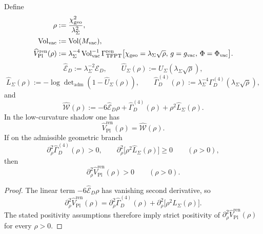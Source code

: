 \begin{lemma}
\label{lem:strict-convexity-rho-planck}
Define
\[
\begin{aligned}
\rho&:=\frac{\chi_{\mathrm{geo}}^2}{\lambda_\Sigma^2},
\\
\operatorname{Vol}_{\mathrm{vac}}&:=\operatorname{Vol}(M_{\mathrm{vac}}),
\\
\widehat V_{\mathrm{Pl}}^{\mathrm{ren}}(\rho)
&:=
\lambda_\Sigma^{-4}\operatorname{Vol}_{\mathrm{vac}}^{-1}
\Gamma_{\mathrm{TFPT}}^{\mathrm{ren}}
\bigl[\chi_{\mathrm{geo}}=\lambda_\Sigma\sqrt{\rho},\,g=g_{\mathrm{vac}},\,\Phi=\Phi_{\mathrm{vac}}\bigr].
\end{aligned}
\]
\[
\widehat{\mathcal E}_D:=\lambda_\Sigma^{-2}\mathcal E_D,
\qquad
\widehat U_\Sigma(\rho):=U_\Sigma(\lambda_\Sigma\sqrt{\rho}),
\]
\[
\widehat L_\Sigma(\rho):=-\log\det\nolimits_{\mathrm{adm}}(1-\widehat U_\Sigma(\rho)),
\qquad
\widehat\Gamma_D^{(4)}(\rho):=\lambda_\Sigma^{-4}\Gamma_D^{(4)}(\lambda_\Sigma\sqrt{\rho}),
\]
and
\[
\widehat{\mathcal W}(\rho):=
-6\widehat{\mathcal E}_D\rho
+\widehat\Gamma_D^{(4)}(\rho)
+\rho^2\widehat L_\Sigma(\rho).
\]
In the low-curvature shadow one has
\[
\widehat V_{\mathrm{Pl}}^{\mathrm{ren}}(\rho)=\widehat{\mathcal W}(\rho).
\]
If on the admissible geometric branch
\[
\partial_\rho^2\widehat\Gamma_D^{(4)}(\rho)>0,
\qquad
\partial_\rho^2\!\bigl[\rho^2\widehat L_\Sigma(\rho)\bigr]\ge 0
\qquad
(\rho>0),
\]
then
\[
\partial_\rho^2\widehat V_{\mathrm{Pl}}^{\mathrm{ren}}(\rho)>0
\qquad
(\rho>0).
\]
\end{lemma}

\begin{proof}
The linear term $-6\widehat{\mathcal E}_D\rho$ has vanishing second derivative, so
\[
\partial_\rho^2\widehat V_{\mathrm{Pl}}^{\mathrm{ren}}(\rho)
=
\partial_\rho^2\widehat\Gamma_D^{(4)}(\rho)
+
\partial_\rho^2\!\bigl[\rho^2\widehat L_\Sigma(\rho)\bigr].
\]
The stated positivity assumptions therefore imply strict positivity of
$\partial_\rho^2\widehat V_{\mathrm{Pl}}^{\mathrm{ren}}(\rho)$ for every $\rho>0$.
\end{proof}


